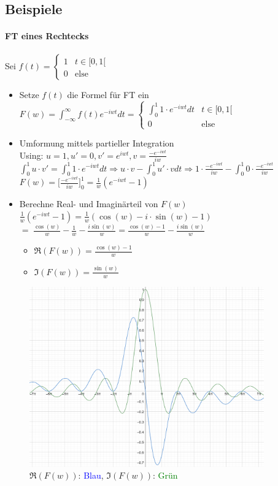 \documentclass[12pt,a4paper]{article}
\newcommand{\blue}[1]{\textcolor{blue} {#1}}
\newcommand{\green}[1]{\textcolor{green} {#1}}
\newcommand{\nl}{\\[0.1cm]}
\begin{document}
\subsection{Beispiele}
\paragraph{FT eines Rechtecks}
Sei $f(t) = \begin{cases}1& t\in[0,1[ \\ 0&\text{else} \end{cases}$
\begin{itemize}
\item Setze $f(t)$ die Formel für FT ein\nl
$\displaystyle F(w) = \int_{-\infty}^{\infty} f(t) e^{-iwt} dt = \begin{cases} \displaystyle\int_0^1 1\cdot e^{-iwt} dt & t\in[0,1[ \\ 0 & \text{else} \end{cases}$
\item Umformung mittels partieller Integration\nl
Using: $u=1, u'=0, v'=e^{iwt}, v=\frac{-e^{-iwt}}{iw}$\nl
$\displaystyle \int_0^1 u\cdot v' = \int_0^1 1\cdot e^{-iwt} dt \Rightarrow u\cdot v - \int_0^1 u'\cdot v dt \Rightarrow 1\cdot \frac{-e^{-iwt}}{iw} - \int_0^1 0\cdot \frac{-e^{-iwt}}{iw}$\nl
$\displaystyle F(w) = \big[\frac{-e^{-iwt}}{iw}\big]^1_0 = \frac{1}{w}(e^{-iwt}-1)$
\item Berechne Real- und Imaginärteil von $F(w)$\nl
$\frac{1}{w}(e^{-iwt}-1) = \frac{1}{w}(\cos(w) - i\cdot \sin(w) -1)$\\
$=\;\frac{\cos(w)}{w} - \frac{1}{w} -\frac{i\sin(w)}{w} = \frac{\cos(w) -1 }{w} - \frac{i\sin(w)}{w}$\nl
\begin{itemize}
\item $\Re(F(w)) = \frac{\cos(w)-1}{w}$
\item $\Im(F(w)) = \frac{\sin(w)}{w}$
\end{itemize}
\end{itemize}
\begin{figure}[H]
\includegraphics[width=0.9\textwidth]{./resources/ft_res.png}
\caption{$\Re(F(w))$: \blue{Blau}, $\Im(F(w))$: \green{Grün}}
\end{figure}
\end{document}
